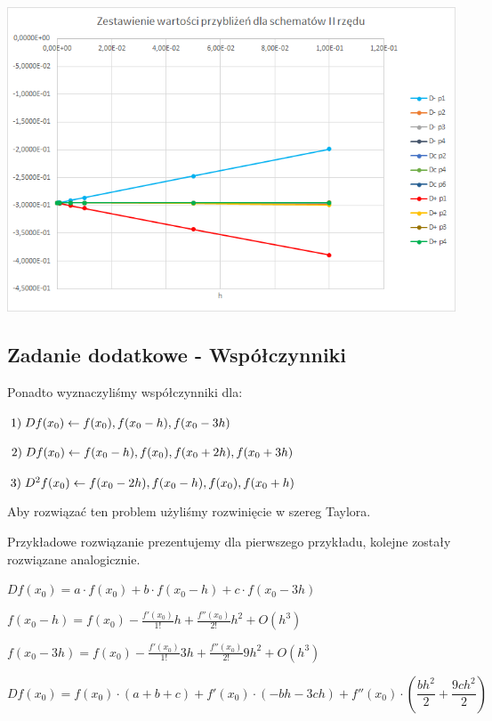 \includegraphics{Lab2/charts/rz2_e.png}

\subsection{Zadanie dodatkowe - Współczynniki}
Ponadto wyznaczyliśmy współczynniki dla:

$1)\hspace{1mm}Df(x_{0}) \leftarrow f(x_{0}), f(x_{0}-h), f(x_{0}-3h) $

$2)\hspace{1mm}Df(x_{0}) \leftarrow f(x_{0}-h), f(x_{0}), f(x_{0}+2h), f(x_{0}+3h) $

$3)\hspace{1mm}D^2f(x_{0}) \leftarrow f(x_{0}-2h), f(x_{0}-h), f(x_{0}), f(x_{0}+h) $
\vspace{0.3cm}

Aby rozwiązać ten problem użyliśmy rozwinięcie w szereg Taylora.

Przykładowe rozwiązanie prezentujemy dla pierwszego przykładu, kolejne zostały rozwiązane analogicznie.

\vspace{0,5cm}

$Df(x_{0}) = a \cdot f(x_{0}) + b \cdot f(x_{0}-h) + c \cdot f(x_{0}-3h) $

$f(x_{0}-h) = f(x_{0}) - \frac{f'(x_{0})}{1!}h + \frac{f''(x_{0})}{2!}h^2 + O(h^3)$

$f(x_{0}-3h) = f(x_{0}) - \frac{f'(x_{0})}{1!}3h + \frac{f''(x_{0})}{2!}9h^2 + O(h^3)$

$Df(x_{0}) = f(x_{0}) \cdot (a+b+c) + f'(x_{0}) \cdot (-bh-3ch) + f''(x_{0}) \cdot (\dfrac{bh^2}{2} + \dfrac{9ch^2}{2}) $

